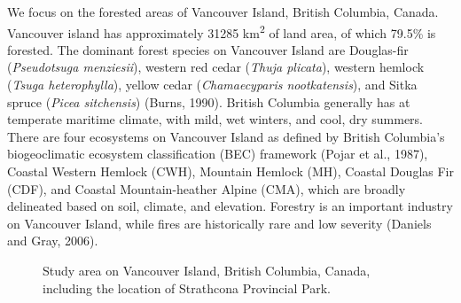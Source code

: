 \documentclass[
]{agujournal2019}
\begin{document}
We focus on the forested areas of Vancouver Island, British Columbia,
Canada. Vancouver island has approximately 31285 km\textsuperscript{2}
of land area, of which 79.5\% is forested. The dominant forest species
on Vancouver Island are Douglas-fir (\emph{Pseudotsuga menziesii}),
western red cedar (\emph{Thuja plicata}), western hemlock (\emph{Tsuga
heterophylla}), yellow cedar (\emph{Chamaecyparis nootkatensis}), and
Sitka spruce (\emph{Picea sitchensis}) (Burns, 1990). British Columbia
generally has at temperate maritime climate, with mild, wet winters, and
cool, dry summers. There are four ecosystems on Vancouver Island as
defined by British Columbia's biogeoclimatic ecosystem classification
(BEC) framework (Pojar et al., 1987), Coastal Western Hemlock (CWH),
Mountain Hemlock (MH), Coastal Douglas Fir (CDF), and Coastal
Mountain-heather Alpine (CMA), which are broadly delineated based on
soil, climate, and elevation. Forestry is an important industry on
Vancouver Island, while fires are historically rare and low severity
(Daniels and Gray, 2006).

\label{cell-fig-study}
\begin{figure}[H]


\caption{\label{fig-study}Study area on Vancouver Island, British
Columbia, Canada, including the location of Strathcona Provincial Park.}

\end{figure}%
\end{document}
